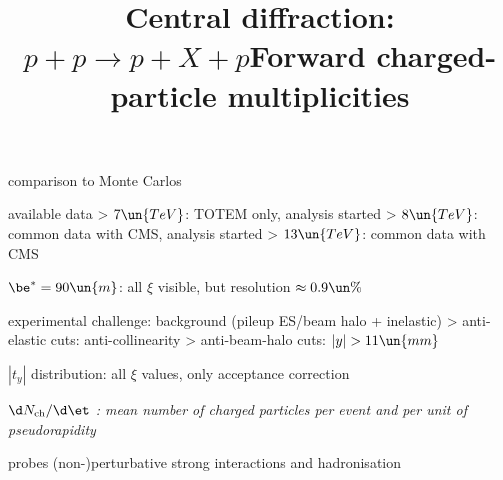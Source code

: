 \> comparison to Monte Carlos

\centerline{}

\newpage %
\title{Central diffraction: $p + p \rightarrow p + X + p$}

\centerline{}

\> available data
\>> $7\un{TeV}$: TOTEM only, analysis started
\>> $8\un{TeV}$: common data with CMS, analysis started
\>> $13\un{TeV}$: common data with CMS

\> $\be^* = 90\un{m}$: all $\xi$ visible, but resolution $\approx 0.9\un{\%}$

\> experimental challenge: background (pileup ES/beam halo + inelastic)
\>> anti-elastic cuts: anti-collinearity
\>> anti-beam-halo cuts: $|y| > 11\un{mm}$

\newpage %

\> $|t_y|$ distribution: all $\xi$ values, only acceptance correction


\newpage %
\title{Forward charged-particle multiplicities}

\> \em{$\d N_{\rm ch} / \d\et$} : mean number of charged particles per event and per unit of pseudorapidity

\> probes (non-)perturbative strong interactions and hadronisation 


\centerline{
}


